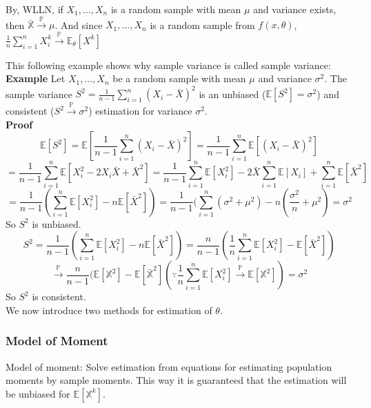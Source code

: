 \documentclass[a4paper,12pt]{article}
\begin{document}
By, WLLN, if $X_1, ..., X_n$ is a random sample with mean $\mu$ and variance exists, then $\bar{\mathbb{X}} \overset{\mathbb{P}}{\to} \mu$. And since $X_1, ..., X_n$ is a random sample from $f(x, \theta)$, $\frac{1}{n}\sum_{i=1}^n X_i^k \overset{\mathbb{P}}{\to} \mathbb{E}_\theta[X^k]$

This following example shows why sample variance is called sample variance:\\

\textbf{Example} Let $X_1, ..., X_n$ be a random sample with mean $\mu$ and variance $\sigma^2$. The sample variance $S^2 = \frac{1}{n-1}\sum_{i=1}^n (X_i-\bar{X})^2$ is an unbiased ($\mathbb{E}[S^2] = \sigma^2$) and consistent ($S^2 \overset{\mathbb{P}}{\to} \sigma^2$) estimation for variance $\sigma^2$.\\

\textbf{Proof} 
$$\mathbb{E}[S^2] = \mathbb{E}[ \frac{1}{n-1}\sum_{i=1}^n (X_i-\bar{X})^2 ] = \frac{1}{n-1}\sum_{i=1}^n\mathbb{E}[ (X_i-\bar{X})^2 ]$$
$$= \frac{1}{n-1}\sum_{i=1}^n\mathbb{E}[ X_i^2-2X_i\bar{X}+\bar{X}^2 ] = \frac{1}{n-1}\sum_{i=1}^n\mathbb{E}[ X_i^2 ] -2\bar{X}\sum_{i=1}^n\mathbb{E}[X_i]+\sum_{i=1}^n\mathbb{E}[\bar{X}^2 ]$$
$$= \frac{1}{n-1}(\sum_{i=1}^n\mathbb{E}[ X_i^2] - n\mathbb{E}[\bar{X}^2]) = \frac{1}{n-1}(\sum_{i=1}^n (\sigma^2 + \mu^2) - n(\frac{\sigma^2}{n} + \mu^2) = \sigma^2$$
So $S^2$ is unbiased.
$$S^2 = \frac{1}{n-1}(\sum_{i=1}^n\mathbb{E}[ X_i^2] - n\mathbb{E}[\bar{X}^2]) = \frac{n}{n-1}(\frac{1}{n}\sum_{i=1}^n\mathbb{E}[ X_i^2] - \mathbb{E}[\bar{X}^2])$$
$$\overset{\mathbb{P}}{\to} \frac{n}{n-1} ( \mathbb{E}[\mathbb{X}^2] - \mathbb{E}[\bar{\mathbb{X}}^2] (\because \frac{1}{n}\sum_{i=1}^n\mathbb{E}[ X_i^2] \overset{\mathbb{P}}{\to} \mathbb{E}[\mathbb{X}^2]) = \sigma^2$$
So $S^2$ is consistent.\\

We now introduce two methods for estimation of $\theta$.\\

\subsubsection{Model of Moment}
Model of moment: Solve estimation from equations for estimating population moments by sample moments. This way it is guaranteed that the estimation will be unbiased for $\mathbb{E}[\mathbb{X}^k]$.\\
\end{document}
